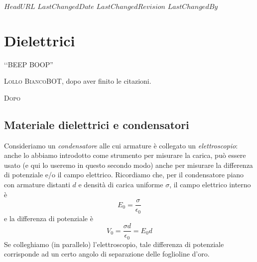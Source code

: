 \svnidlong
{$HeadURL$}
{$LastChangedDate$}
{$LastChangedRevision$}
{$LastChangedBy$}

\chapter{Dielettrici}

\begin{introduction}
	‘‘BEEP BOOP''
	\begin{flushright}
		\textsc{Lollo BiancoBOT}, dopo aver finito le citazioni. %
	\end{flushright}
\end{introduction}
\lettrine[findent=1pt, nindent=0pt]{D}{opo}
\section{Materiale dielettrici e condensatori}
Consideriamo un \textit{condensatore} alle cui armature è collegato un \textit{elettroscopio}: anche lo abbiamo introdotto come strumento per misurare la carica, può essere usato (e qui lo useremo in questo secondo modo) anche per misurare la differenza di potenziale e/o il campo elettrico. Ricordiamo che, per il condensatore piano con armature distanti $d$ e densità di carica uniforme $\sigma$, il campo elettrico interno è
\begin{equation*}
	E_0=\frac{\sigma}{\epsilon_0}
\end{equation*}
e la differenza di potenziale è
\begin{equation*}
	V_0=\frac{\sigma d}{\epsilon_0}=E_0d
\end{equation*}
Se colleghiamo (in parallelo) l'elettroscopio, tale differenza di potenziale corrisponde ad un certo angolo di separazione delle foglioline d'oro. 
